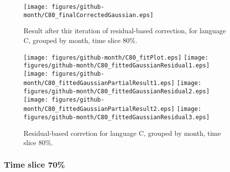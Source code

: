 \begin{figure}[]
\centering
{\texttt{[image: figures/github-month/C80\_finalCorrectedGaussian.eps]}}
\caption{Result after thir iteration of residual-based correction, for language C, grouped by month, time slice 80\%.}
\end{figure}


\begin{figure}[hb]
\centering
{}
{\texttt{[image: figures/github-month/C80\_fitPlot.eps]}}
{\texttt{[image: figures/github-month/C80\_fittedGaussianResidual1.eps]}}
{\texttt{[image: figures/github-month/C80\_fittedGaussianPartialResult1.eps]}}
{\texttt{[image: figures/github-month/C80\_fittedGaussianResidual2.eps]}}
{\texttt{[image: figures/github-month/C80\_fittedGaussianPartialResult2.eps]}}
{\texttt{[image: figures/github-month/C80\_fittedGaussianResidual3.eps]}}
\caption{Residual-based corretion for language C, grouped by month, time slice 80\%.}
\end{figure}


\clearpage 
\newpage 


\FloatBarrier

\subsubsection{Time slice 70\%}

